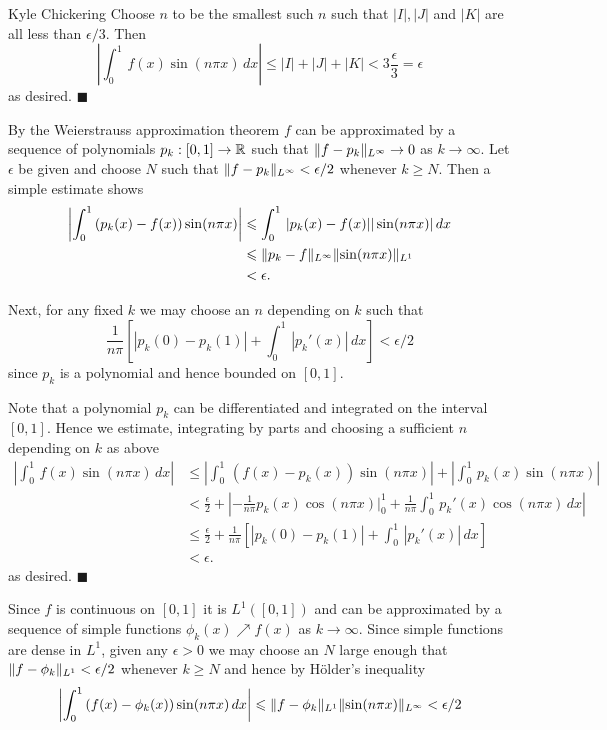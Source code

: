 \begin{solution}{Kyle Chickering}
	Choose $n$ to be the smallest such $n$ such that $|I|, |J|$ and $|K|$ are all less than $\epsilon/3$.
    Then
    \[ \left|\int_0^1\,f(x)\sin(n\pi x)\,dx\right| \leqslant |I| + |J| + |K| < 3\frac{\epsilon}{3} = \epsilon \]
	as desired. $\blacksquare$

	By the Weierstrauss approximation theorem $f$ can be approximated by a sequence of polynomials $p_k:[0,1]\rightarrow \mathbb{R}$ such that $\lVert f-p_k\rVert_{L^\infty}\rightarrow 0$ as $k\rightarrow \infty$.
    Let $\epsilon$ be given and choose $N$ such that $\lVert f-p_k\rVert_{L^\infty}<\epsilon/2$ whenever $k\geqslant N$.
    Then a simple estimate shows
	\begin{align*}
		\left|\int_0^1\,(p_k(x)-f(x))\sin(n\pi x)\right| &\leqslant \int_0^1\,|p_k(x)-f(x)||\sin(n\pi x)|\,dx \\
                                                         &\leqslant \lVert p_k-f\rVert_{L^\infty}\lVert\sin(n\pi x)\rVert_{L^1} \\
                                                         &< \epsilon.
	\end{align*}

	Next, for any fixed $k$ we may choose an $n$ depending on $k$ such that
    \[ \frac{1}{n\pi}\left[|p_k(0)-p_k(1)|+\int_0^1\,|p_k'(x)|\,dx\right] < \epsilon/2 \]
	since $p_k$ is a polynomial and hence bounded on $[0,1]$.
	
	Note that a polynomial $p_k$ can be differentiated and integrated on the interval $[0,1]$.
    Hence we estimate, integrating by parts and choosing a sufficient $n$ depending on $k$ as above
	\begin{align*}
		\left|\int_0^1\,f(x)\sin(n\pi x)\,dx \right| &\leqslant \left|\int_0^1\,(f(x)-p_k(x))\sin(n\pi x)\right| + \left|\int_0^1\,p_k(x)\sin(n\pi x)\right| \\
                                                     &< \frac{\epsilon}{2} + \left|-\frac{1}{n\pi}p_k(x)\cos(n\pi x)\big|_0^1 + \frac{1}{n\pi}\int_0^1\,p_k'(x)\cos(n\pi x)\,dx\right| \\
                                                     &\leqslant \frac{\epsilon}{2} + \frac{1}{n\pi}\left[|p_k(0)-p_k(1)|+\int_0^1\,|p_k'(x)|\,dx\right] \\
                                                     &< \epsilon.
	\end{align*}
	as desired. $\blacksquare$

	Since $f$ is continuous on $[0,1]$ it is $L^1([0,1])$ and can be approximated by a sequence of simple functions $\phi_k(x)\nearrow f(x)$ as $k\rightarrow \infty$.
    Since simple functions are dense in $L^1$, given any $\epsilon > 0$ we may choose an $N$ large enough that $\lVert f-\phi_k\rVert_{L^1}<\epsilon/2$ whenever $k\geqslant N$ and hence by H\"older's inequality
    \[ \left|\int_0^1\,(f(x)-\phi_k(x))\sin(n\pi x)\,dx\right| \leqslant \lVert f-\phi_k\rVert_{L^1}\lVert\sin(n\pi x)\rVert_{L^\infty} < \epsilon/2 \]


\end{solution}
